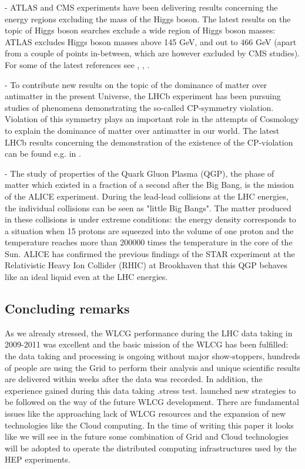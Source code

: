 - ATLAS and CMS experiments have been delivering results concerning
the energy regions excluding the mass of the Higgs boson. The latest
results on the topic of Higgs boson searches exclude a wide region
of Higgs boson masses: ATLAS excludes Higgs boson masses above 145
GeV, and out to 466 GeV (apart from a couple of points in-between,
which are however excluded by CMS studies). For some of the latest
references see \cite{higgs}, \cite{higgs2}, \cite{higgs3}.

- To contribute new results on the topic of the dominance of matter
over antimatter in the present Universe, the LHCb experiment has
been pursuing studies of phenomena demonstrating the so-called
CP-symmetry violation. Violation of this symmetry plays an
important role in the attempts of Cosmology to explain the dominance
of matter over antimatter in our world. The latest LHCb results
concerning the demonstration of the existence of the CP-violation
can be found e.g. in \cite{cpvio}.

- The study of properties of the Quark Gluon Plasma (QGP), the phase
of matter which existed in a fraction of a second after the Big
Bang, is the mission of the ALICE experiment. During the lead-lead
collisions at the LHC energies, the individual collisions can be
seen as "little Big Bangs". The matter produced in these collisions
is under extreme conditions: the energy density corresponds to a
situation when 15 protons are squeezed into the volume of one proton
and the temperature reaches more than 200000 times the temperature
in the core of the Sun. ALICE has confirmed the previous findings of
the STAR experiment at the Relativistic Heavy Ion Collider (RHIC) at
Brookhaven that this QGP behaves like an ideal liquid \cite{alice_pbpb} even
at the LHC energies.


\subsection{Concluding remarks}

 As we already stressed, the WLCG performance
during the LHC data taking in 2009-2011 was excellent and the basic
mission of the WLCG has been fulfilled: the data taking and
processing is ongoing without major show-stoppers, hundreds of
people are using the Grid to perform their analysis and unique
scientific results are delivered within weeks after the data was
recorded. In addition, the experience gained during this data taking
.stress test. launched new strategies to be followed on the way of
the future WLCG development. There are fundamental issues like the
approaching lack of WLCG resources and the expansion of new
technologies like the Cloud computing. In the time of writing this
paper it looks like we will see in the future some combination of
Grid and Cloud technologies will be adopted to operate the
distributed computing infrastructures used by the HEP experiments.

